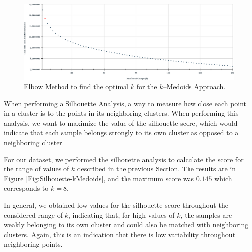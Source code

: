 \begin{figure}[h]
	\centering
	\includegraphics[scale=0.5]{../Figures/Elbow-Kmedoids}
	\caption{Elbow Method to find the optimal $k$ for the $k$--Medoids Approach.}
	\label{Fig:SSE-kMedoids}
\end{figure}

When performing a Silhouette Analysis, a way to measure how close each point in a cluster is to the points in its neighboring clusters. %
When performing this analysis, we want to maximize the value of the silhouette score, which would indicate that each sample belongs strongly to its own cluster as opposed to a neighboring cluster.

For our dataset, we performed the silhouette analysis to calculate the score for the range of values of $k$ described in the previous Section. The results are in Figure \ref{Fig:Silhouette-kMedoids}, and the maximum score was $0.145$ which corresponds to $k = 8$. 

In general, we obtained low values for the silhouette score throughout the considered range of $k$, indicating that, for high values of $k$, the samples are weakly belonging to its own cluster and could also be matched with neighboring clusters. Again, this is an indication that there is low variability throughout neighboring points.

